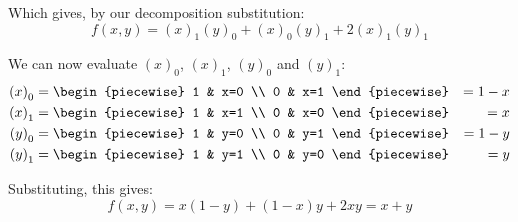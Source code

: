 \begin{example}
    Which gives, by our decomposition substitution:
    $$
        f(x,y)={(x)}_{1}{(y)}_{0}+{(x)}_{0}{(y)}_{1}+2{(x)}_{1}{(y)}_{1}
    $$

    We can now evaluate ${(x)}_0$, ${(x)}_1$, ${(y)}_0$ and ${(y)}_1$:
    \begin{align*}
        {(x)}_0 &= \begin{piecewise}
            1 & x=0 \\
            0 & x=1
        \end{piecewise} &= 1-x \\
        {(x)}_1 &= \begin{piecewise}
            1 & x=1 \\
            0 & x=0
        \end{piecewise} &= x \\
        {(y)}_0 &= \begin{piecewise}
            1 & y=0 \\
            0 & y=1
        \end{piecewise} &= 1-y \\
        {(y)}_1 &= \begin{piecewise}
            1 & y=1 \\
            0 & y=0
        \end{piecewise} &= y \\
    \end{align*}

    Substituting, this gives:
    $$
        f(x,y)=x(1-y)+(1-x)y+2xy=x+y
    $$
\end{example}

\newpage